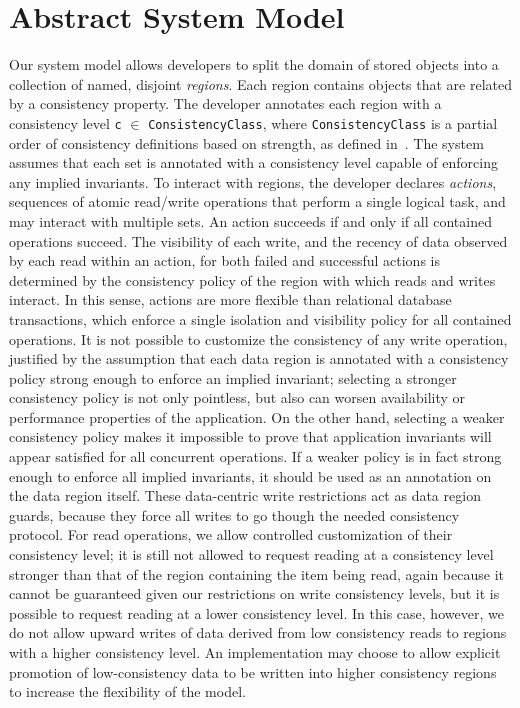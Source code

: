 \documentclass[preprint,numbers]{sigplanconf}
\begin{document}
\section{Abstract System Model}
Our system model allows developers to split the domain of stored objects into a
collection of named, disjoint
\emph{regions}. Each
region contains objects that are related by a consistency property. The
developer annotates each region with a consistency level \texttt{c} $\in$
\texttt{ConsistencyClass}, where \texttt{ConsistencyClass} is a partial order
of consistency definitions based on strength, as defined
in~\cite{sivaramakrishnan2015declarative}. The system assumes that each
set is annotated with a consistency level capable of
enforcing any implied invariants. To interact with regions, the developer
declares \emph{actions}, sequences of atomic
read/write operations that perform a single logical task, and may interact with
multiple sets. An action succeeds if and only if all contained operations
succeed. The visibility of each write, and the recency of
data observed by each read within an action, for both failed and successful
actions is determined by the consistency policy of the region with which reads
and writes interact. In this sense, actions are more flexible than relational
database transactions, which enforce a single isolation and visibility policy for all contained
operations. It is not possible to customize the consistency of any write operation, justified
by the assumption that each data region is annotated with a consistency policy strong enough to enforce 
an implied invariant; selecting a stronger
consistency policy is not only pointless, but also can worsen
availability or performance properties of the application. On the other hand,
selecting a weaker consistency policy makes it impossible to prove that
application invariants will appear satisfied for all concurrent
operations. If a weaker policy is in fact strong enough to enforce all implied
invariants, it should be used as an annotation on the data region itself. 
These data-centric write restrictions act as data region guards, because they force all writes to go
though the needed consistency protocol. For read operations, we allow controlled customization of 
their consistency level; it is still not allowed to request reading
at a consistency level stronger than that of the region containing the item
being read, again because it cannot be guaranteed given our restrictions on
write consistency levels, but it is possible to
request reading at a lower consistency level. In this case, however, we do not allow
upward writes of data derived from low
consistency reads to regions with a higher consistency level. An implementation may choose to
allow explicit promotion of low-consistency data to be written into higher
consistency regions to increase the flexibility of the model.
\end{document}
